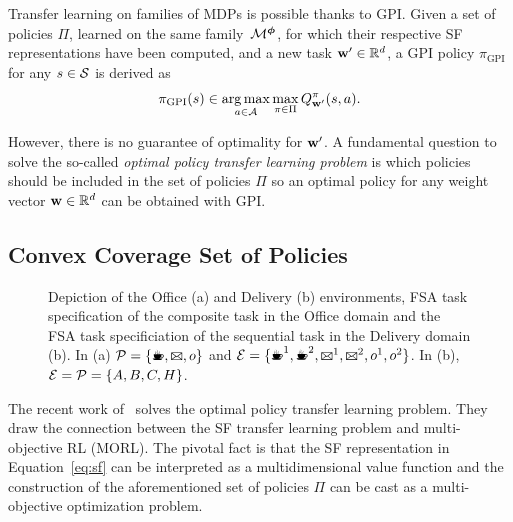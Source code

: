 Transfer learning on families of MDPs is possible thanks to GPI. Given a set of policies $\Pi$, learned on the same family~$\mathcal{M}^{\boldsymbol{\phi}}$, for which their respective SF representations have been computed, and a new task $\mathbf{w}'\in\mathbb{R}^d$, a GPI policy $\pi_{\text{GPI}}$ for any $s\in\mathcal{S}$ is derived as 
\begin{equation}
    \pi_{\text{GPI}}(s) \in \operatorname*{arg\,max}_{a\in\mathcal{A}} \max_{\pi\in\Pi} Q^\pi_{\mathbf{w}'}(s, a).
    \label{eq:gpi}
\end{equation}

However, there is no guarantee of optimality for $\mathbf{w}'$.
A fundamental question to solve the so-called \textit{optimal policy transfer learning problem} is which policies should be included in the set of policies $\Pi$ so an optimal policy for any weight vector $\mathbf{w}\in\mathbb{R}^d$ can be obtained with GPI. 

\subsection*{Convex Coverage Set of Policies}

\begin{figure}[!tb]
  \begin{subfigure}[t]{0.5\textwidth}
    \centering
    
    \subcaption{}
    \label{fig:office_domain}
  \end{subfigure} 
  \hfill
  \begin{subfigure}[t]{0.5\textwidth}
    \centering
    
    \subcaption{}
    \label{fig:delivery_domain}
  \end{subfigure}
  \hfill
  \caption{Depiction of the Office (a) and Delivery (b) environments, FSA task specification of the composite task in the Office domain and the FSA task specificiation of the sequential task in the Delivery domain (b). In (a) $\cP=\{\text{\coffee}, \text{\mail}, o\}$ and $\cE=\{\text{\coffee}^1,\text{\coffee}^2, \text{\mail}^1,\text{\mail}^2, o^1, o^2\}$. In (b), $\mathcal{E}=\mathcal{P}=\{A, B, C, H\}$.}
 \label{fig:domains}
\end{figure}

The recent work of~\citep{Alegre2022} solves the optimal policy transfer learning problem. They draw the connection between the SF transfer learning problem and multi-objective RL (MORL). The pivotal fact is that the SF representation in Equation~\eqref{eq:sf} can be interpreted as a multidimensional value function and the construction of the aforementioned set of policies $\Pi$ can be cast as a multi-objective optimization problem.
 
